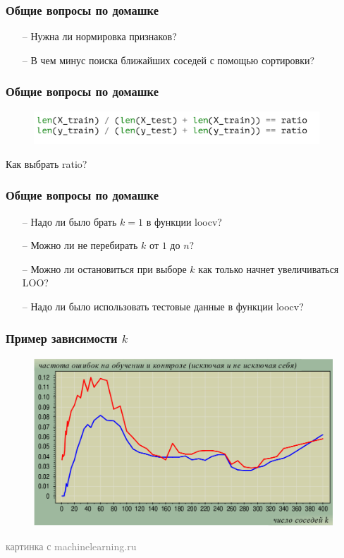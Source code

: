 \documentclass[12pt]{beamer}
\begin{document}
\begin{frame}\frametitle{Общие вопросы по домашке}
\begin{itemize}
\item[--] Нужна ли нормировка признаков?
\item[--] В чем минус поиска ближайших соседей с помощью сортировки?
\end{itemize}
\end{frame}

\begin{frame}\frametitle{Общие вопросы по домашке}
\begin{figure}[htbp]
  \includegraphics[height=35pt, keepaspectratio = true]{images/hw}  
\end{figure}

\vspace{5mm}
Как выбрать ratio?
\end{frame}

\begin{frame}\frametitle{Общие вопросы по домашке}
\begin{itemize}
\item[--] Надо ли было брать $k = 1$ в функции loocv?
\item[--] Можно ли не перебирать $k$ от $1$ до $n$?
\item[--] Можно ли остановиться при выборе $k$ как только начнет увеличиваться LOO?
\item[--] Надо ли было использовать тестовые данные в функции loocv?
\end{itemize}
\end{frame}

\begin{frame}\frametitle{Пример зависимости $k$}
\begin{figure}[htbp]
  \includegraphics[height=180pt, keepaspectratio = true]{images/breast_cancer}  
\end{figure}
\textcolor{gray}{картинка с machinelearning.ru}
\end{frame}
\end{document}
